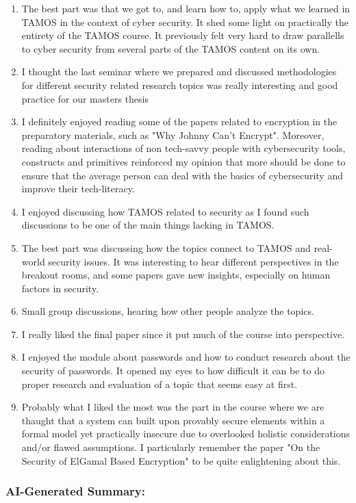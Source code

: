 \documentclass[a4paper]{report}
\begin{document}
\begin{enumerate}
  \item The best part was that we got to, and learn how to, apply what we learned in TAMOS in the context of cyber security. It shed some light on practically the entirety of the TAMOS course. It previously felt very hard to draw parallells to cyber security from several parts of the TAMOS content on its own.
  \item I thought the last seminar where we prepared and discussed methodologies for different security related research topics was really interesting and good practice for our masters thesis
  \item I definitely enjoyed reading some of the papers related to encryption in the preparatory materials, such as "Why Johnny Can't Encrypt". Moreover, reading about interactions of non tech-savvy people with cybersecurity tools, constructs and primitives reinforced my opinion that more should be done to ensure that the average person can deal with the basics of cybersecurity and improve their tech-literacy. 
  \item I enjoyed discussing how TAMOS related to security as I found such discussions to be one of the main things lacking in TAMOS.
  \item The best part was discussing how the topics connect to TAMOS and real-world security issues. It was interesting to hear different perspectives in the breakout rooms, and some papers gave new insights, especially on human factors in security.
  \item Small group discussions, hearing how other people analyze the topics.
  \item I really liked the final paper since it put much of the course into perspective. 
  \item I enjoyed the module about passwords and how to conduct research about the security of passwords. It opened my eyes to how difficult it can be to do proper research and evaluation of a topic that seems easy at first.
  \item Probably what I liked the most was the part in the course where we are thaught that a system can built upon provably secure elements within a formal model yet practically insecure due to overlooked holistic considerations and/or flawed assumptions. I particularly remember the paper "On the Security of ElGamal Based Encryption" to be quite enlightening about this.
\end{enumerate}

\subsubsection{AI-Generated Summary:}
\end{document}
